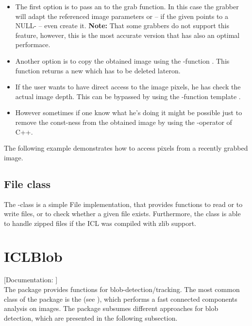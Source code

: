 \begin{itemize}
\item The first option is to pass an  to the grab function. In this case the grabber will adapt the referenced image parameters or -- if the given  points to a NULL- -- even create it. \textbf{Note:} That some grabbers do not support this feature, however, this is the most accurate version that has also an optimal performace.
\item Another option is to copy the obtained image using the -function . This function returns a new  which has to be deleted lateron.
\item If the user wants to have direct access to the image pixels, he has check the actual image depth. This can be bypassed by using the -function template .
\item However sometimes if one know what he's doing it might be possible just to remove the const-ness from the obtained image by using the -operator of C++.
\end{itemize} 

The following example demonstrates how to access pixels from a recently grabbed image.


\subsection{File class}
The -class  is a simple File implementation, that provides functions to read or to write files, or to check whether a given file exists. Furthermore, the  class is able to handle zipped files if the ICL was compiled with zlib support.


\section{ICLBlob\label{sec:blob}}

[Documentation: ]\\

The package  provides functions for blob-detection/tracking. The most common class of the package is the   (see ), which performs a fast connected components analysis on images. The package subsumes different approaches for blob detection, which are presented in the following subsection.

